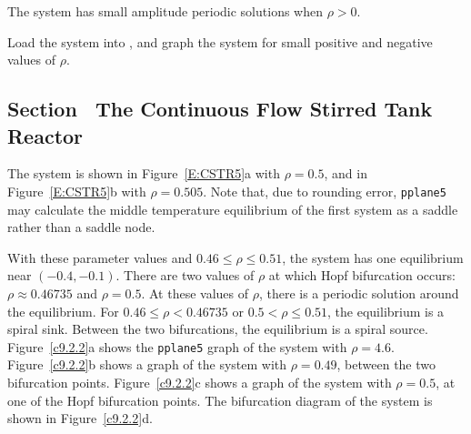 \documentclass{ximera}
\begin{document}
\ans The system has small amplitude periodic solutions when $\rho > 0$.

\soln Load the system into \Matlab, and graph the
system for small positive and negative values of $\rho$.



\newpage
\subsection*{Section~\protect{\ref{S:CSTR}} The Continuous Flow Stirred Tank
Reactor}

The system is shown in Figure~\ref{E:CSTR5}a with $\rho = 0.5$, and in
Figure~\ref{E:CSTR5}b with $\rho = 0.505$.  Note that, due to rounding
error, {\tt pplane5} may calculate the middle temperature equilibrium of
the first system as a saddle rather than a saddle node.  

\begin{figure}[htb]
                       \centerline{%
                       }
\end{figure}

With these parameter values and $0.46 \leq \rho \leq 0.51$, the system
has one equilibrium near $(-0.4,-0.1)$.  There are two values of $\rho$
at which Hopf bifurcation occurs: $\rho \approx 0.46735$ and
$\rho = 0.5$.  At these values of $\rho$, there is a periodic solution
around the equilibrium.  For $0.46 \leq \rho < 0.46735$ or $0.5 < \rho
\leq 0.51$, the equilibrium is a spiral sink.  Between the two
bifurcations, the equilibrium is a spiral source.  Figure~\ref{c9.2.2}a
shows the {\tt pplane5} graph of the system with $\rho = 4.6$. 
Figure~\ref{c9.2.2}b shows a graph of the system with $\rho = 0.49$,
between the two bifurcation points.  Figure~\ref{c9.2.2}c shows a graph
of the system with $\rho = 0.5$, at one of the Hopf bifurcation points.
The bifurcation diagram of the system is shown in Figure~\ref{c9.2.2}d.

\begin{figure}[htb]
                       \centerline{%
                       }
\end{figure}
\end{document}
